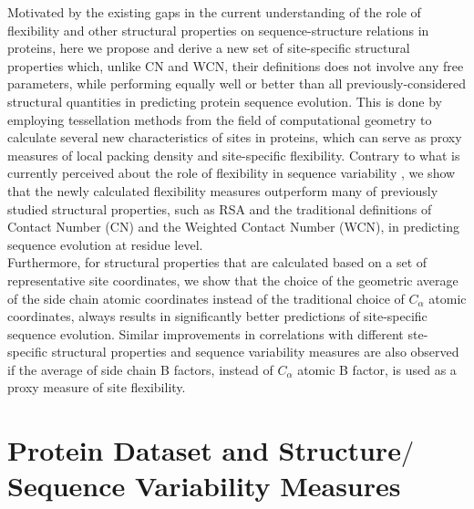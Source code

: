 \documentclass[11pt]{article}
\begin{document}
    Motivated by the existing gaps in the current understanding of the role of flexibility and other structural properties on sequence-structure relations in proteins, here we propose and derive a new set of site-specific structural properties which, unlike CN and WCN, their definitions does not involve any free parameters, while performing equally well or better than all previously-considered structural quantities in predicting protein sequence evolution. This is done by employing tessellation methods from the field of computational geometry to calculate several new characteristics of sites in proteins, which can serve as proxy measures of local packing density and site-specific flexibility. Contrary to what is currently perceived about the role of flexibility in sequence variability \citep[e.g.,][]{huang_mechanistic_2014}, we show that the newly calculated flexibility measures outperform many of previously studied structural properties, such as RSA and the traditional definitions of Contact Number (CN) and the Weighted Contact Number (WCN), in predicting sequence evolution at residue level. \\

    Furthermore, for structural properties that are calculated based on a set of representative site coordinates,  we show that the choice of the geometric average of the side chain atomic coordinates instead of the traditional choice of $C_\alpha$ atomic coordinates, always results in significantly better predictions of site-specific sequence evolution. Similar improvements in correlations with different ste-specific structural properties and sequence variability measures are also observed if the average of side chain B factors, instead of $C_\alpha$ atomic B factor, is used as a proxy measure of site flexibility. \\


\section{Protein Dataset and Structure$/$Sequence Variability Measures}
\label{sec:methods}
\end{document}
